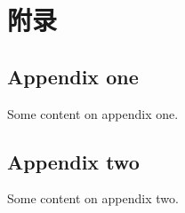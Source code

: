\appendix
\section*{附\hspace*{2\ccwd}录}
\renewcommand{\thesubsection}{\Alph{subsection}}

\subsection{Appendix one}

Some content on appendix one.

\subsection{Appendix two}

Some content on appendix two.

\pagebreak